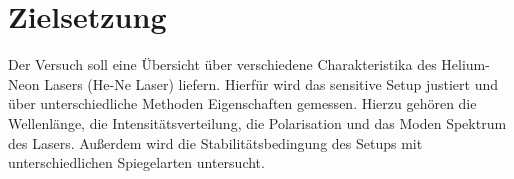 \chapter{Zielsetzung}
\label{cha:zielsetzung}

Der Versuch soll eine Übersicht über verschiedene Charakteristika des Helium-Neon Lasers (He-Ne Laser) liefern.
Hierfür wird das sensitive Setup justiert und über unterschiedliche Methoden Eigenschaften gemessen. Hierzu gehören
die Wellenlänge, die Intensitätsverteilung, die Polarisation und das Moden Spektrum des Lasers. Außerdem wird
die Stabilitätsbedingung des Setups mit unterschiedlichen Spiegelarten untersucht.